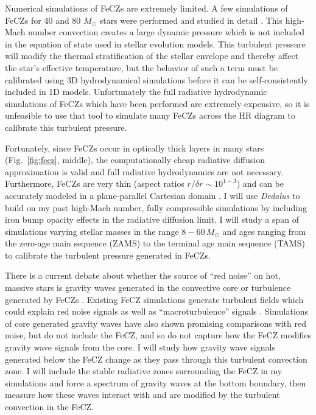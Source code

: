 \documentclass[11pt]{amsart} %
\theoremstyle{definition}
\numberwithin{equation}{section}
\begin{document}
Numerical simulations of FeCZs are extremely limited.
A few simulations of FeCZs for 40 and 80 $M_{\odot}$ stars were performed \citep{jiang_etal_2015} and studied in detail \citep{schultz_etal_2020,schultz_etal_2022,schultz_etal_2022b}.
This high-Mach number convection creates a large dynamic pressure which is not included in the equation of state used in stellar evolution models.
This turbulent pressure will modify the thermal stratification of the stellar envelope and thereby affect the star's effective temperature, but the behavior of such a term must be calibrated using 3D hydrodynamical simulations before it can be self-consistently included in 1D models.
Unfortunately the full radiative hydrodynamic simulations of FeCZs which have been performed \citep{jiang_etal_2015} are extremely expensive, so it is unfeasible to use that tool to simulate many FeCZs across the HR diagram to calibrate this turbulent pressure.

Fortunately, since FeCZs occur in optically thick layers in many stars (Fig.~\ref{fig:fecz}, middle), the computationally cheap radiative diffusion approximation is valid and full radiative hydrodynamics are not necessary.
Furthermore, FeCZs are very thin (aspect ratios $r / \delta r \sim 10^{1-3}$) and can be accurately modeled in a plane-parallel Cartesian domain \citep{jermyn_etal_2022_atlas}.
I will use \emph{Dedalus} to build on my past high-Mach number, fully compressible simulations \citep{anders_brown_2017} by including iron bump opacity effects in the radiative diffusion limit.
I will study a span of simulations varying stellar masses in the range $8-60\, M_{\odot}$ and ages ranging from the zero-age main sequence (ZAMS) to the terminal age main sequence (TAMS) to calibrate the turbulent pressure generated in FeCZs.

There is a current debate about whether the source of ``red noise'' on hot, massive stars \citep[Fig.~\ref{fig:intro}, right;][]{bowman_etal_2019} is gravity waves generated in the convective core or turbulence generated by FeCZs \citep{cantiello_etal_2021}.
Existing FeCZ simulations generate turbulent fields which could explain red noise signals as well as ``macroturbulence'' signals \citep{schultz_etal_2022,schultz_etal_2022b}.
Simulations of core generated gravity waves \citep{edelmann_etal_2019,horst_etal_2020} have also shown promising comparisons with red noise, but do not include the FeCZ, and so do not capture how the FeCZ modifies gravity wave signals from the core.
I will study how gravity wave signals generated below the FeCZ change as they pass through this turbulent convection zone.
I will include the stable radiative zones surrounding the FeCZ in my simulations and force a spectrum of gravity waves at the bottom boundary, then measure how these waves interact with and are modified by the turbulent convection in the FeCZ.
\end{document}
